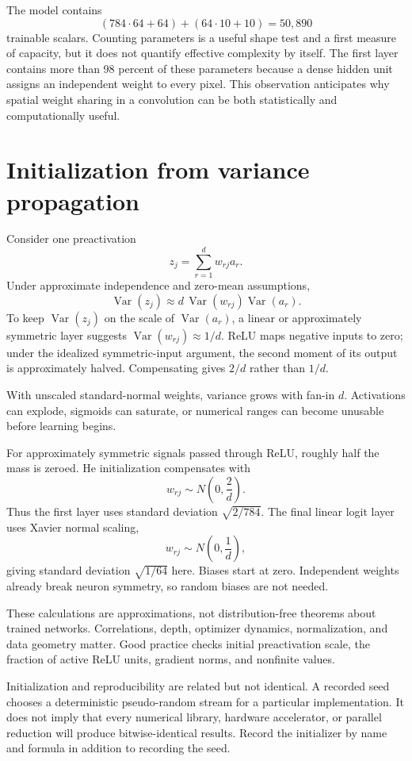The model contains
\[
  (784\cdot64+64)+(64\cdot10+10)=50{,}890
\]
trainable scalars. Counting parameters is a useful shape test and a first
measure of capacity, but it does not quantify effective complexity by itself.
The first layer contains more than 98 percent of these parameters because a
dense hidden unit assigns an independent weight to every pixel. This
observation anticipates why spatial weight sharing in a convolution can be
both statistically and computationally useful.

\section{Initialization from variance propagation}

Consider one preactivation
\[
  z_j=\sum_{r=1}^{d}w_{rj}a_r.
\]
Under approximate independence and zero-mean assumptions,
\[
  \operatorname{Var}(z_j)
  \approx d\,\operatorname{Var}(w_{rj})\operatorname{Var}(a_r).
\]
To keep $\operatorname{Var}(z_j)$ on the scale of
$\operatorname{Var}(a_r)$, a linear or approximately symmetric layer suggests
$\operatorname{Var}(w_{rj})\approx1/d$. ReLU maps negative inputs to zero; under
the idealized symmetric-input argument, the second moment of its output is
approximately halved. Compensating gives $2/d$ rather than $1/d$.

With unscaled standard-normal weights, variance grows with fan-in $d$.
Activations can explode, sigmoids can saturate, or numerical ranges can become
unusable before learning begins.

For approximately symmetric signals passed through ReLU, roughly half the
mass is zeroed. He initialization compensates with
\[
  w_{rj}\sim N\!\left(0,\frac{2}{d}\right).
\]
Thus the first layer uses standard deviation $\sqrt{2/784}$. The final linear
logit layer uses Xavier normal scaling,
\[
  w_{rj}\sim N\!\left(0,\frac{1}{d}\right),
\]
giving standard deviation $\sqrt{1/64}$ here. Biases start at zero. Independent
weights already break neuron symmetry, so random biases are not needed.

These calculations are approximations, not distribution-free theorems about
trained networks. Correlations, depth, optimizer dynamics, normalization, and
data geometry matter. Good practice checks initial preactivation scale, the
fraction of active ReLU units, gradient norms, and nonfinite values.

Initialization and reproducibility are related but not identical. A recorded
seed chooses a deterministic pseudo-random stream for a particular
implementation. It does not imply that every numerical library, hardware
accelerator, or parallel reduction will produce bitwise-identical results.
Record the initializer by name and formula in addition to recording the seed.

